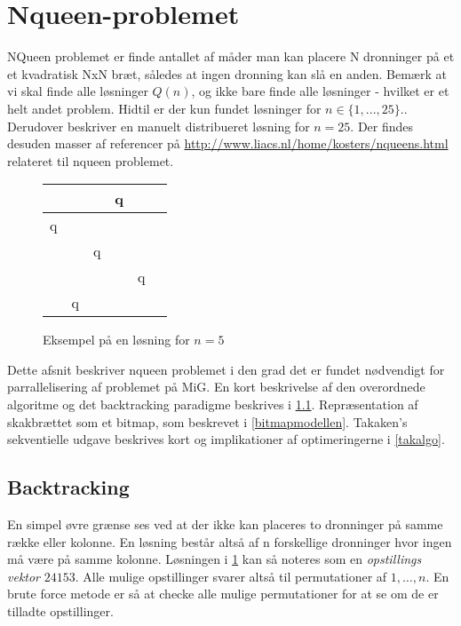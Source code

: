 \documentclass[pdf,draft,a4paper,10pt]{article}
\newcommand{\mig}{MiG}
\def\chs#1{{\chessfont#1}}
\begin{document}
\section{Nqueen-problemet}\label{nqueenproblemet}

NQueen problemet er finde antallet af måder man kan placere N dronninger på et et kvadratisk NxN bræt, således at ingen dronning kan slå en anden. Bemærk at vi skal finde alle løsninger $Q(n)$, og ikke bare finde alle løsninger - hvilket er et helt andet problem. Hidtil er der kun fundet løsninger for $n \in \{1,...,25\}$.\cite{sekvenser}. Derudover beskriver \cite{etsi} en manuelt distribueret løsning for $n=25$. Der findes desuden masser af referencer på \url{http://www.liacs.nl/home/kosters/nqueens.html} relateret til nqueen problemet. 

\begin{figure}
\begin{center}
\begin{tabular}{|c|c|c|c|c|c}
\hline	 &  & &   \chs{q} & \\
\hline	\chs{q} & &  &  & \\
\hline	 & & \chs{q} &  &  \\
\hline	 &  &  & & \chs{q} \\
\hline	 & \chs{q} & &  &  \\
\hline
\end{tabular}
\end{center}
\caption{Eksempel på en løsning for $n=5$}
\label{fig:nq5eks}
\end{figure}


Dette afsnit beskriver nqueen problemet i den grad det er fundet nødvendigt for parrallelisering af problemet på \mig. En kort beskrivelse af den overordnede algoritme og det backtracking paradigme beskrives i \ref{backtracking}. Repræsentation af skakbrættet som et bitmap, som beskrevet i \ref{bitmapmodellen}. Takaken's sekventielle udgave beskrives kort og implikationer af optimeringerne i \ref{takalgo}. 


\subsection{Backtracking}\label{backtracking}

En simpel øvre grænse ses ved at der ikke kan placeres to dronninger på samme række eller kolonne. En løsning består altså af n forskellige dronninger hvor ingen må være på samme kolonne. Løsningen i \ref{fig:nq5eks} kan så noteres som en \textit{opstillings vektor} $24153$. Alle mulige opstillinger svarer altså til permutationer af ${1,\ldots,n}$. En brute force metode er så at checke alle mulige permutationer for at se om de er tilladte opstillinger.
\end{document}
